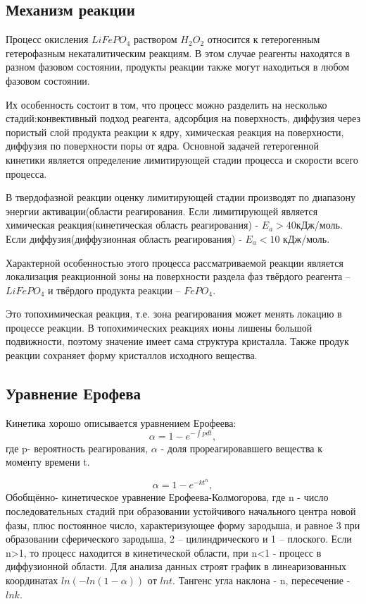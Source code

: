 \documentclass[a4paper,12pt]{article} %
\begin{document}
\subsection{Механизм реакции}
Процесс окисления $LiFePO_4$ раствором $H_2O_2$ относится к гетерогенным гетерофазным некаталитическим реакциям. В этом случае реагенты находятся в разном фазовом состоянии, продукты реакции также могут находиться в любом фазовом состоянии. \par 
Их особенность состоит в том, что процесс можно разделить на несколько стадий:конвективный подход реагента, адсорбция на поверхность, диффузия через пористый слой продукта реакции к ядру, химическая реакция на поверхности, диффузия по поверхности поры от ядра. Основной задачей гетерогенной кинетики является определение лимитирующей стадии процесса и скорости всего процесса.\par 
В твердофазной реакции оценку лимитирующей стадии производят по диапазону энергии активации(области реагирования. Если лимитирующей является химическая реакция(кинетическая область реагирования) - $E_a > 40$кДж/моль. Если диффузия(диффузионная область реагирования) - $E_a < 10$ кДж/моль.\par
Характерной особенностью этого процесса рассматриваемой реакции является локализация реакционной зоны на поверхности раздела фаз твёрдого реагента –  $LiFePO_4$ и твёрдого продукта реакции – $FePO_4$.\par 
Это топохимическая реакция, т.е. зона реагирования может менять локацию в процессе реакции. В топохимических реакциях ионы лишены большой подвижности, поэтому значение имеет сама структура кристалла. Также продук реакции сохраняет форму кристаллов исходного вещества.\par
\subsection{Уравнение Ерофева}
Кинетика хорошо описывается уравнением Ерофеева:
\begin{equation}
    \alpha = 1- e^{-\int p dt},
\end{equation}
где p- вероятность реагирования, $\alpha$ - доля прореагировавшего вещества к моменту времени t. \par 
\begin{equation}
    \alpha = 1- e^{-kt^n},
\end{equation}
Обобщённо- кинетическое уравнение Ерофеева-Колмогорова, где n - число последовательных стадий при образовании устойчивого начального центра новой фазы, плюс постоянное число, характеризующее форму зародыша, и равное 3 при образовании сферического зародыша, 2 – цилиндрического и 1 – плоского. Если n>1, то процесс находится в кинетической области, при n<1 - процесс в диффузионной области. Для анализа данных строят график в линеаризованных координатах $ln(-ln(1-\alpha))$ от $lnt$. Тангенс угла наклона - n, пересечение - $lnk$.\par 
\end{document}
